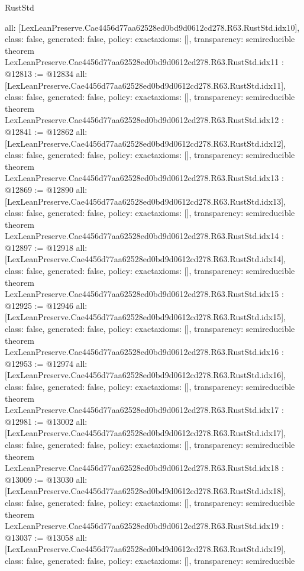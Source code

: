 \begin{lexlean}{RustStd}
\begin{coremodule}
{  all: [LexLeanPreserve.Cae4456d77aa62528ed0bd9d0612cd278.R63.RustStd.idx10],
  class: false,
  generated: false,
  policy: exact{axioms: []},
  transparency: semireducible
}
theorem LexLeanPreserve.Cae4456d77aa62528ed0bd9d0612cd278.R63.RustStd.idx11 : @12813 := @12834 {
  all: [LexLeanPreserve.Cae4456d77aa62528ed0bd9d0612cd278.R63.RustStd.idx11],
  class: false,
  generated: false,
  policy: exact{axioms: []},
  transparency: semireducible
}
theorem LexLeanPreserve.Cae4456d77aa62528ed0bd9d0612cd278.R63.RustStd.idx12 : @12841 := @12862 {
  all: [LexLeanPreserve.Cae4456d77aa62528ed0bd9d0612cd278.R63.RustStd.idx12],
  class: false,
  generated: false,
  policy: exact{axioms: []},
  transparency: semireducible
}
theorem LexLeanPreserve.Cae4456d77aa62528ed0bd9d0612cd278.R63.RustStd.idx13 : @12869 := @12890 {
  all: [LexLeanPreserve.Cae4456d77aa62528ed0bd9d0612cd278.R63.RustStd.idx13],
  class: false,
  generated: false,
  policy: exact{axioms: []},
  transparency: semireducible
}
theorem LexLeanPreserve.Cae4456d77aa62528ed0bd9d0612cd278.R63.RustStd.idx14 : @12897 := @12918 {
  all: [LexLeanPreserve.Cae4456d77aa62528ed0bd9d0612cd278.R63.RustStd.idx14],
  class: false,
  generated: false,
  policy: exact{axioms: []},
  transparency: semireducible
}
theorem LexLeanPreserve.Cae4456d77aa62528ed0bd9d0612cd278.R63.RustStd.idx15 : @12925 := @12946 {
  all: [LexLeanPreserve.Cae4456d77aa62528ed0bd9d0612cd278.R63.RustStd.idx15],
  class: false,
  generated: false,
  policy: exact{axioms: []},
  transparency: semireducible
}
theorem LexLeanPreserve.Cae4456d77aa62528ed0bd9d0612cd278.R63.RustStd.idx16 : @12953 := @12974 {
  all: [LexLeanPreserve.Cae4456d77aa62528ed0bd9d0612cd278.R63.RustStd.idx16],
  class: false,
  generated: false,
  policy: exact{axioms: []},
  transparency: semireducible
}
theorem LexLeanPreserve.Cae4456d77aa62528ed0bd9d0612cd278.R63.RustStd.idx17 : @12981 := @13002 {
  all: [LexLeanPreserve.Cae4456d77aa62528ed0bd9d0612cd278.R63.RustStd.idx17],
  class: false,
  generated: false,
  policy: exact{axioms: []},
  transparency: semireducible
}
theorem LexLeanPreserve.Cae4456d77aa62528ed0bd9d0612cd278.R63.RustStd.idx18 : @13009 := @13030 {
  all: [LexLeanPreserve.Cae4456d77aa62528ed0bd9d0612cd278.R63.RustStd.idx18],
  class: false,
  generated: false,
  policy: exact{axioms: []},
  transparency: semireducible
}
theorem LexLeanPreserve.Cae4456d77aa62528ed0bd9d0612cd278.R63.RustStd.idx19 : @13037 := @13058 {
  all: [LexLeanPreserve.Cae4456d77aa62528ed0bd9d0612cd278.R63.RustStd.idx19],
  class: false,
  generated: false,
  policy: exact{axioms: []},
  transparency: semireducible
}
\end{coremodule}
\end{lexlean}
